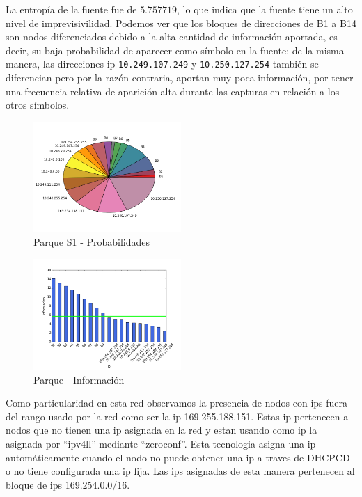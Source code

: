 \documentclass[final,inline,narroweqnarray,a4paper]{ieee}
\begin{document}
La entropía de la fuente fue de $5.757719$, lo que indica que la fuente tiene un alto nivel de imprevisivilidad. Podemos ver que los bloques de direcciones de B1 a B14 son nodos diferenciados debido a la alta cantidad de información aportada, es decir, su baja probabilidad de aparecer como símbolo en la fuente; de la misma manera, las direcciones ip \texttt{10.249.107.249} y \texttt{10.250.127.254} también se diferencian pero por la razón contraria, aportan muy poca información, por tener una frecuencia relativa de aparición alta durante las capturas en relación a los otros símbolos.

\begin{figure}[H]
    \begin{center}
        \includegraphics[width=0.5\textwidth]{plot/parqueS1-pie.png}
        \caption{Parque S1 - Probabilidades}
        \label{torta:parqueS1}
    \end{center}
\end{figure} 

\begin{figure}[H]
    \begin{center}
        \includegraphics[width=0.5\textwidth]{plot/parqueS1-bar.png}
        \caption{Parque - Información}
        \label{histo:parqueS1}
    \end{center}
\end{figure}

Como particularidad en esta red observamos la presencia de nodos con ips fuera del rango usado por la red como ser la ip 169.255.188.151. Estas ip pertenecen a nodos que no tienen una ip asignada en la red y estan usando como ip la asignada por ``ipv4ll'' mediante ``zeroconf''. Esta tecnologia asigna una ip automáticamente cuando el nodo no puede obtener una ip a traves de DHCPCD o no tiene configurada una ip fija. Las ips asignadas de esta manera pertenecen al bloque de ips 169.254.0.0/16.
\end{document}
